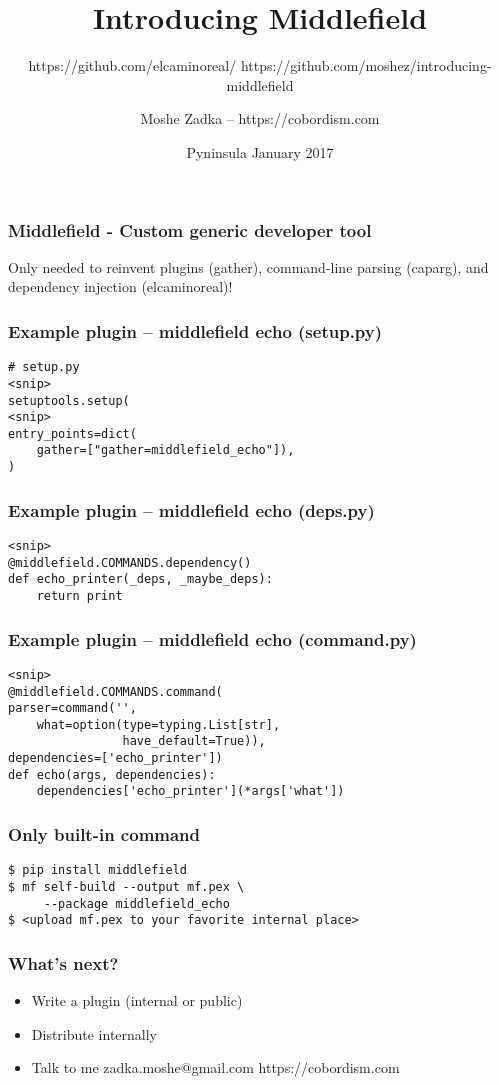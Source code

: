 \documentclass{beamer}
\title{Introducing Middlefield}
\subtitle{https://github.com/elcaminoreal/ https://github.com/moshez/introducing-middlefield}
\author{Moshe Zadka -- https://cobordism.com}
\date{Pyninsula January 2017}
\begin{document}
 
\frame{\titlepage}

\begin{frame}
\frametitle{Middlefield - Custom generic developer tool}
Only needed to reinvent plugins (gather),
command-line parsing (caparg),
and dependency injection (elcaminoreal)!
\end{frame}

\begin{frame}[fragile]
\frametitle{Example plugin -- middlefield echo (setup.py)}
\begin{lstlisting}
# setup.py
<snip>
setuptools.setup(
<snip>
entry_points=dict(
    gather=["gather=middlefield_echo"]),
)
\end{lstlisting}
\end{frame}

\begin{frame}[fragile]
\frametitle{Example plugin -- middlefield echo (deps.py)}
\begin{lstlisting}
<snip>
@middlefield.COMMANDS.dependency()
def echo_printer(_deps, _maybe_deps):
    return print
\end{lstlisting}
\end{frame}

\begin{frame}[fragile]
\frametitle{Example plugin -- middlefield echo (command.py)}
\begin{lstlisting}
<snip>
@middlefield.COMMANDS.command(
parser=command('',
    what=option(type=typing.List[str],
                have_default=True)),
dependencies=['echo_printer'])
def echo(args, dependencies):
    dependencies['echo_printer'](*args['what'])
\end{lstlisting}
\end{frame}

\begin{frame}[fragile]
\frametitle{Only built-in command}
\begin{lstlisting}
$ pip install middlefield
$ mf self-build --output mf.pex \
     --package middlefield_echo
$ <upload mf.pex to your favorite internal place>
\end{lstlisting}
\end{frame}

\begin{frame}
\frametitle{What's next?}
\begin{itemize}
\item Write a plugin (internal or public)
\item Distribute internally
\item Talk to me zadka.moshe@gmail.com https://cobordism.com
\end{itemize}
\end{frame}
\end{document}
